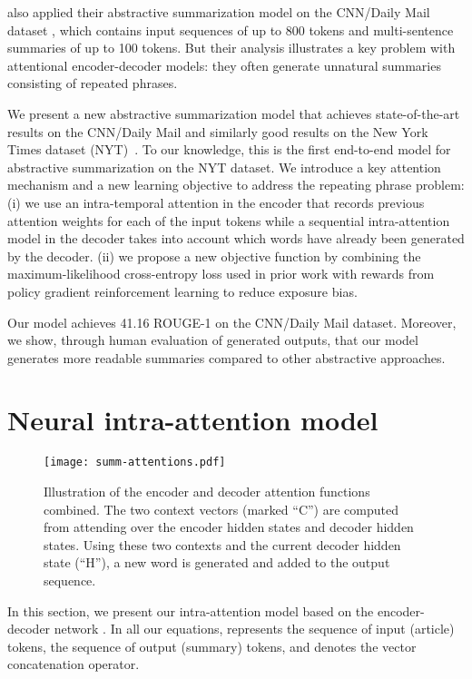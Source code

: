 \documentclass{article} \usepackage{iclr2018_arxiv,times}
\begin{document}
\citet{nallapati2016} also applied their abstractive summarization model on the CNN/Daily Mail dataset \citep{hermann2015}, which contains input sequences of up to 800 tokens and multi-sentence summaries of up to 100 tokens.
But their analysis illustrates a key problem with attentional encoder-decoder models:
they often generate unnatural summaries consisting of repeated phrases.

We present a new abstractive summarization model that achieves state-of-the-art results on the CNN/Daily Mail and similarly good results on the New York Times dataset (NYT)~\citep{sandhaus2008}. To our knowledge, this is the first end-to-end model for abstractive summarization on the NYT dataset.
We introduce a key attention mechanism and a new learning objective to address the repeating phrase problem: (i) we use an intra-temporal attention in the encoder that records previous attention weights for each of the input tokens while a sequential intra-attention model in the decoder takes into account which words have already been generated by the decoder. 
(ii) we propose a new objective function by combining the maximum-likelihood cross-entropy loss used in prior work with rewards from policy gradient reinforcement learning to reduce exposure bias.

Our model achieves 41.16 ROUGE-1 on the CNN/Daily Mail dataset.
Moreover, we show, through human evaluation of generated outputs, that our model generates more readable summaries compared to other abstractive approaches.


\section{Neural intra-attention model}

\begin{figure*}
\centering
\texttt{[image: summ-attentions.pdf]}
\caption{Illustration of the encoder and decoder attention functions combined. The two context vectors (marked ``C'') are computed from attending over the encoder hidden states and decoder hidden states. Using these two contexts and the current decoder hidden state (``H''), a new word is generated and added to the output sequence.}
\label{fig:sum-attentions}
\end{figure*}

\label{sec:model}

In this section, we present our intra-attention model based on the encoder-decoder network \citep{sutskever2014}. In all our equations,  represents the sequence of input (article) tokens,  the sequence of output (summary) tokens, and  denotes the vector concatenation operator.
\end{document}
